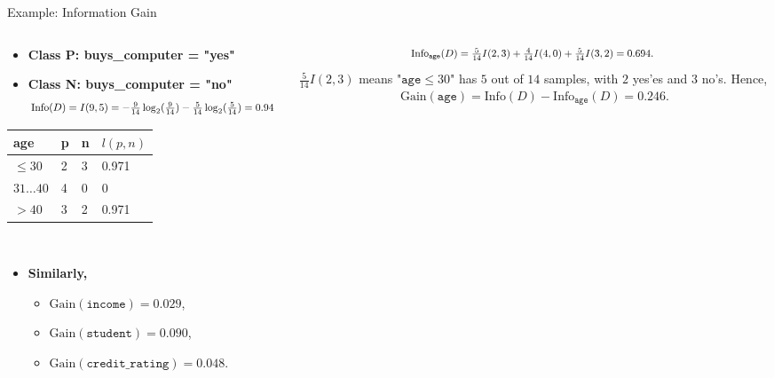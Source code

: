 \begin{frame}{Example: Information Gain}
	\begin{columns}
		\begin{column}{0.45\textwidth}
			\vspace*{-2em}
			\begin{itemize}
				\item \textbf{Class P: buys\_computer = "yes"}
				\item \textbf{Class N: buys\_computer = "no"}
				      \begin{align*}
					      \resizebox{7cm}{!}{%
						      $\text{Info}(D) = I(9,5) = - \frac{9}{14}\log_2(\frac{9}{14})-\frac{5}{14} \log_2(\frac{5}{14}) = 0.94$
					      }
				      \end{align*}
			\end{itemize}
			\centering
			\begin{tabular}{|l|l|l|l|}
				\hline
				\cellcolor{faugray!62}age     & \cellcolor{faugray!62}p & \cellcolor{faugray!62}n & \cellcolor{faugray!62}$l(p,n)$ \\\hline
				\cellcolor{white}$\leq 30$    & 2                       & 3                       & 0.971                          \\\hline
				\cellcolor{white}$31\ldots40$ & 4                       & 0                       & 0                              \\\hline
				\cellcolor{white}$>40$        & 3                       & 2                       & 0.971                          \\\hline
			\end{tabular}\\[0.2cm]
			\begin{itemize}
				\item \textbf{Similarly,}
				      \begin{itemize}
					      \item $\text{Gain}(\texttt{income}) = 0.029$,
					      \item $\text{Gain}(\texttt{student}) = 0.090$,
					      \item $\text{Gain}(\texttt{credit\_rating}) = 0.048$.
				      \end{itemize}
			\end{itemize}
		\end{column}
		\begin{column}{0.45\textwidth}
			\vspace{-1.3cm}
			\begin{align*}
				\resizebox{7cm}{!}{%
				$\text{Info}_{\texttt{age}}(D) = \frac{5}{14}I(2,3) + \frac{4}{14} I(4,0) + \frac{5}{14} I(3,2) = 0.694$.
				}
			\end{align*}
			$\frac{5}{14} I(2,3)$ means "$\texttt{age} \leq 30$" has $5$ out of $14$ samples, with $2$ yes'es and $3$ no's. Hence,
			\vspace*{-.5em}
			\begin{align*}
				\text{Gain}(\texttt{age}) = \text{Info}(D)-\text{Info}_{\texttt{age}}(D) = 0.246.
			\end{align*}


\end{column}
\end{columns}
\end{frame}
